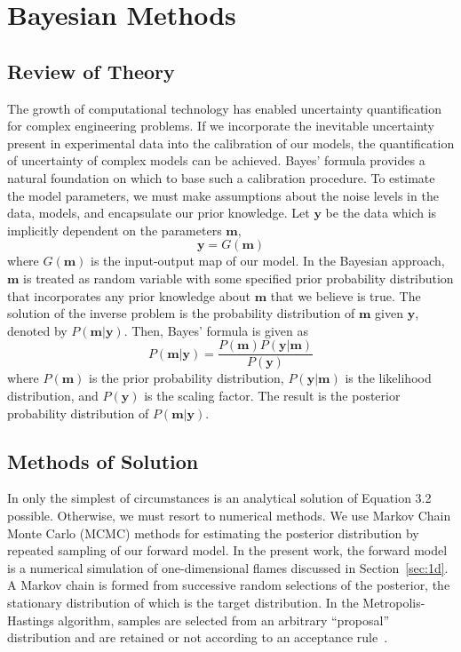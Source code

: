 \chapter{Bayesian Methods}\label{chap:Bayes}
\section{Review of Theory}

The growth of computational technology has enabled uncertainty
quantification for complex engineering problems. If we incorporate the
inevitable uncertainty present in experimental
data into the calibration of our models, the quantification of
uncertainty of complex models can be
achieved. Bayes' formula provides a natural foundation on which to
base such a calibration procedure.
To estimate the model parameters, we must make
assumptions about the noise levels in the data, models, and
encapsulate our prior knowledge. Let
$\mathbf{y}$ be the data which is implicitly dependent on the parameters $\mathbf{m}$,
%
\begin{equation}
  \mathbf{y} = G(\mathbf{m})
\end{equation}
%
  where $G(\mathbf{m})$ is the input-output map of our model. In the Bayesian approach, $\mathbf{m}$ is treated as random variable with some
  specified prior probability distribution that incorporates any prior
  knowledge about $\mathbf{m}$ that we believe is true. The solution of the inverse problem is the
  probability distribution of $\mathbf{m}$ given $\mathbf{y}$, denoted by $P(\mathbf{m}|\mathbf{y})$. Then, Bayes'
  formula is given as~\cite{Sivia}
  \begin{equation}
    P(\mathbf{m}|\mathbf{y}) = \frac{P(\mathbf{m}) P(\mathbf{y}|\mathbf{m})}{P(\mathbf{y})}
  \end{equation}
%
 where $P(\mathbf{m})$ is the prior probability distribution, $P(\mathbf{y}|\mathbf{m})$
 is the likelihood distribution, and $P(\mathbf{y})$ is the scaling factor.
 The result is the posterior probability distribution of $P(\mathbf{m}|\mathbf{y})$.

\section{Methods of Solution}

In only the simplest of circumstances is an analytical solution of Equation 3.2
possible. Otherwise, we must resort to numerical methods.
 We use Markov Chain Monte Carlo (MCMC) methods for estimating the posterior
 distribution by repeated sampling of our forward model. In the
 present work, the forward model is a numerical simulation of
 one-dimensional flames discussed in Section~\ref{sec:1d}. A Markov chain is formed from successive
 random selections of the posterior, the stationary distribution of which is the target
 distribution. In the Metropolis-Hastings algorithm, samples are
 selected from an arbitrary “proposal” distribution and are retained
 or not according to an acceptance rule~\cite{RobertCasella2004}.

